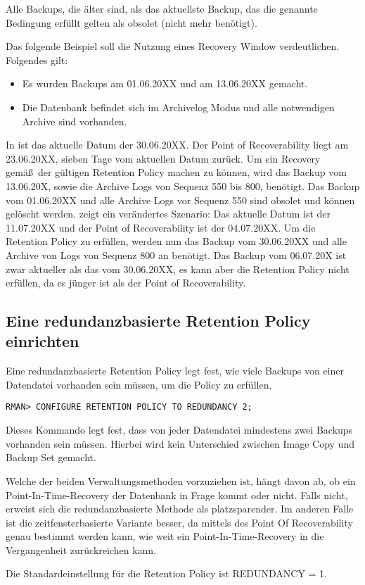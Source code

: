         Alle Backups, die älter sind, als das aktuellste Backup, das die genannte Bedingung erfüllt gelten als obsolet (nicht mehr benötigt).

        Das folgende Beispiel soll die Nutzung eines Recovery Window verdeutlichen. Folgendes gilt:
        \begin{itemize}
          \item Es wurden Backups am 01.06.20XX und am 13.06.20XX gemacht.
          \item Die Datenbank befindet sich im Archivelog Modus und alle notwendigen Archive sind vorhanden.
        \end{itemize}
        In  ist das aktuelle Datum der 30.06.20XX. Der Point of Recoverability liegt am 23.06.20XX, sieben Tage vom aktuellen Datum zurück. Um ein Recovery gemäß\ der gültigen Retention Policy machen zu können, wird das Backup vom 13.06.20X, sowie die Archive Logs von Sequenz 550 bis 800, benötigt. Das Backup vom 01.06.20XX und alle Archive Logs vor Sequenz 550 sind obsolet und können gelöscht werden.
         zeigt ein verändertes Szenario:
        Das aktuelle Datum ist der 11.07.20XX und der Point of Recoverability ist der 04.07.20XX. Um die Retention Policy zu erfüllen, werden nun das Backup vom 30.06.20XX und alle Archive von Logs von Sequenz 800 an benötigt. Das Backup vom 06.07.20X ist zwar aktueller als das vom 30.06.20XX, es kann aber die Retention Policy nicht erfüllen, da es jünger ist als der Point of Recoverability.
      \subsection{Eine redundanzbasierte Retention Policy einrichten}
        Eine redundanzbasierte Retention Policy legt fest, wie viele Backups von einer Datendatei vorhanden sein müssen, um die Policy zu erfüllen.
        \begin{lstlisting}[caption={REDUNDANCY setzen},label=admin1026,language=rman]
RMAN> CONFIGURE RETENTION POLICY TO REDUNDANCY 2;
        \end{lstlisting}
        Dieses Kommando legt fest, dass von jeder Datendatei mindestens zwei Backups vorhanden sein müssen. Hierbei wird kein Unterschied zwischen Image Copy und Backup Set gemacht.

        Welche der beiden Verwaltungsmethoden vorzuziehen ist, hängt davon ab, ob ein Point-In-Time-Recovery der Datenbank in Frage kommt oder nicht. Falls nicht, erweist sich die redundanzbasierte Methode als platzsparender. Im anderen Falle ist die zeitfensterbasierte Variante besser, da mittels des Point Of Recoverability genau bestimmt werden kann, wie weit ein Point-In-Time-Recovery in die Vergangenheit zurückreichen kann.
        \begin{merke}
          Die Standardeinstellung für die Retention Policy ist REDUNDANCY = 1.
        \end{merke}
\clearpage
